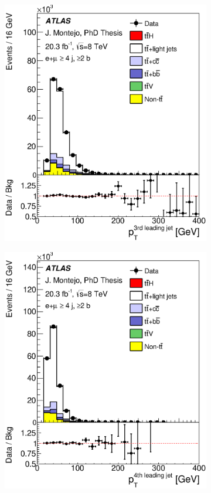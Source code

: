 \begin{figure}[tp!]
\begin{subfigure}{0.32\textwidth}
  \includegraphics[width=\textwidth]{Modeling/Figures/plots_4j2b/jet3_pt_ELEMUON_4jetin2btagin_NOMINAL.eps}
  \caption{} \end{subfigure}
  \begin{subfigure}{0.32\textwidth}
  \includegraphics[width=\textwidth]{Modeling/Figures/plots_4j2b/jet4_pt_ELEMUON_4jetin2btagin_NOMINAL.eps}

\end{subfigure}
\end{figure}
